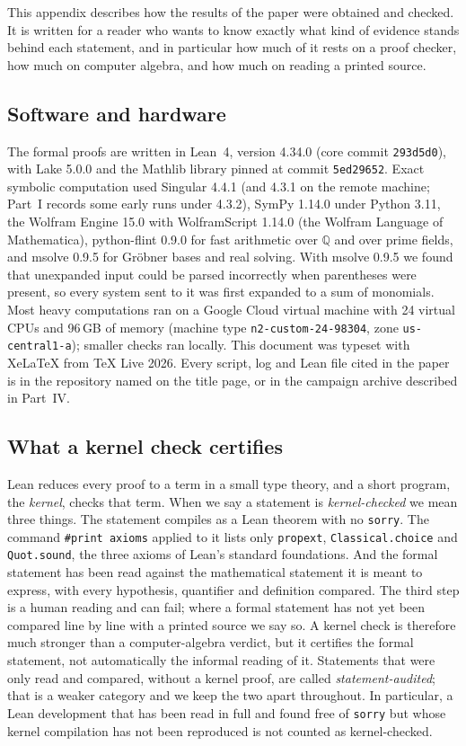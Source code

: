 \documentclass[a4paper,11pt]{article}
\theoremstyle{jsplain}
\theoremstyle{jsdef}
\theoremstyle{jsrem}
\begin{document}
This appendix describes how the results of the paper were obtained and checked. It is written for a reader who wants to know exactly what kind of evidence stands behind each statement, and in particular how much of it rests on a proof checker, how much on computer algebra, and how much on reading a printed source.

\subsection{Software and hardware}

The formal proofs are written in Lean~4, version 4.34.0 (core commit \texttt{293d5d0}), with Lake 5.0.0 and the Mathlib library pinned at commit \texttt{5ed29652}. Exact symbolic computation used Singular 4.4.1 (and 4.3.1 on the remote machine; Part~I records some early runs under 4.3.2), SymPy 1.14.0 under Python 3.11, the Wolfram Engine 15.0 with WolframScript 1.14.0 (the Wolfram Language of Mathematica), python-flint 0.9.0 for fast arithmetic over $\mathbb{Q}$ and over prime fields, and msolve 0.9.5 for Gr\"obner bases and real solving. With msolve 0.9.5 we found that unexpanded input could be parsed incorrectly when parentheses were present, so every system sent to it was first expanded to a sum of monomials. Most heavy computations ran on a Google Cloud virtual machine with 24 virtual CPUs and 96\,GB of memory (machine type \texttt{n2-custom-24-98304}, zone \texttt{us-central1-a}); smaller checks ran locally. This document was typeset with Xe\LaTeX{} from TeX Live 2026. Every script, log and Lean file cited in the paper is in the repository named on the title page, or in the campaign archive described in Part~IV.

\subsection{What a kernel check certifies}

Lean reduces every proof to a term in a small type theory, and a short program, the \emph{kernel}, checks that term. When we say a statement is \emph{kernel-checked} we mean three things. The statement compiles as a Lean theorem with no \texttt{sorry}. The command \texttt{\#print axioms} applied to it lists only \texttt{propext}, \texttt{Classical.choice} and \texttt{Quot.sound}, the three axioms of Lean's standard foundations. And the formal statement has been read against the mathematical statement it is meant to express, with every hypothesis, quantifier and definition compared. The third step is a human reading and can fail; where a formal statement has not yet been compared line by line with a printed source we say so. A kernel check is therefore much stronger than a computer-algebra verdict, but it certifies the formal statement, not automatically the informal reading of it. Statements that were only read and compared, without a kernel proof, are called \emph{statement-audited}; that is a weaker category and we keep the two apart throughout. In particular, a Lean development that has been read in full and found free of \texttt{sorry} but whose kernel compilation has not been reproduced is not counted as kernel-checked.
\end{document}
